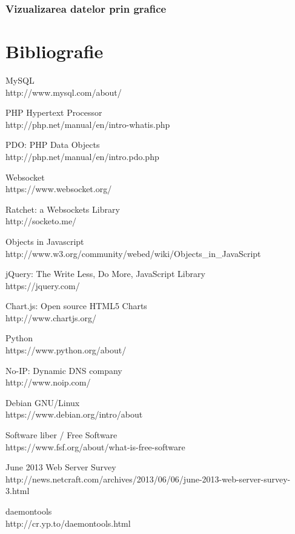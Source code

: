 \documentclass[14pt,a4paper]{extarticle}
\begin{document}
\subsubsection{Vizualizarea datelor prin grafice}

\newpage
\section{Bibliografie}
\begingroup
\renewcommand{\section}[2]{}%
\begin{thebibliography}{99}

	MySQL \\
	http://www.mysql.com/about/

	PHP Hypertext Processor\\
	http://php.net/manual/en/intro-whatis.php

	PDO: PHP Data Objects\\
	http://php.net/manual/en/intro.pdo.php
	
	Websocket\\
	https://www.websocket.org/
	
	Ratchet: a Websockets Library\\
	http://socketo.me/
	
	Objects in Javascript\\
	http://www.w3.org/community/webed/wiki/Objects\_in\_JavaScript
	
	jQuery: The Write Less, Do More, JavaScript Library\\
	https://jquery.com/

	Chart.js: Open source HTML5 Charts \\
	http://www.chartjs.org/
	
	Python \\
	https://www.python.org/about/
	
	No-IP: Dynamic DNS company \\
	http://www.noip.com/
	
	Debian GNU/Linux \\
	https://www.debian.org/intro/about

	Software liber / Free Software \\
	https://www.fsf.org/about/what-is-free-software
	
	June 2013 Web Server Survey\\
http://news.netcraft.com/archives/2013/06/06/june-2013-web-server-survey-3.html
	
	daemontools\\
	http://cr.yp.to/daemontools.html

\end{thebibliography}
\endgroup
\newpage
\tableofcontents
\end{document}
